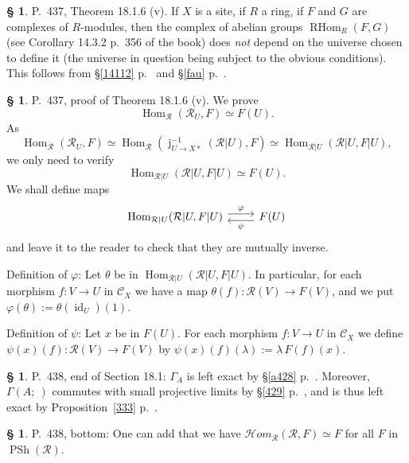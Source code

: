 \documentclass[12pt]{article}
\theoremstyle{remark}
\theoremstyle{definition}
\newtheorem{s}[thm]{\S}
\newcommand{\cc}{\mathcal}
\newcommand{\oo}{\operatorname}
\newcommand{\C}{\mathcal C}
\newcommand{\pp}{\varphi}
\newcommand{\HOM}{\cc H\!\mathit{om}}
\DeclareMathOperator{\id}{id}
\DeclareMathOperator{\Hom}{Hom}
\DeclareMathOperator{\RHom}{RHom}
\begin{document}
%

\begin{s}
P.~437, Theorem 18.1.6 (v). If $X$ is a site, if $R$ a ring, if $F$ and $G$ are complexes of $R$-modules, then the complex of abelian groups $\RHom_R(F,G)$ (see Corollary 14.3.2 p.~356 of the book) does {\em not} depend on the universe chosen to define it (the universe in question being subject to the obvious conditions). This follows from \S\ref{14112} p.~\pageref{14112} and \S\ref{fau} p.~\pageref{fau}. 
\end{s} 

%

\begin{s} 
P.~437, proof of Theorem 18.1.6 (v). We prove 
$$
\Hom_{\cc R}(\cc R_U,F)\simeq F(U).
$$ 
As 
$$
\Hom_{\cc R}(\cc R_U,F)\simeq\Hom_{\cc R}(\oo j_{U\to X*}^{-1}(\cc R|U),F)\simeq
\Hom_{\cc R|U}(\cc R|U,F|U), 
$$ 
we only need to verify 
$$
\Hom_{\cc R|U}(\cc R|U,F|U)\simeq F(U).
$$ 
We shall define maps 
$$
\begin{tikzcd}
\Hom_{\cc R|U}(\cc R|U,F|U)\ar[yshift=0.7ex]{r}{\pp}&F(U)\ar[yshift=-0.7ex]{l}{\psi}
\end{tikzcd}
$$ 
and leave it to the reader to check that they are mutually inverse. 

Definition of $\pp$: Let $\theta$ be in $\Hom_{\cc R|U}(\cc R|U,F|U)$. In particular, for each morphism $f:V\to U$ in $\C_X$ we have a map $\theta(f):\cc R(V)\to F(V)$, and we put $\pp(\theta):=\theta(\id_U)(1)$. 

Definition of $\psi$: Let $x$ be in $F(U)$. For each morphism $f:V\to U$ in $\C_X$ we define $\psi(x)(f):\cc R(V)\to F(V)$ by $\psi(x)(f)(\lambda):=\lambda\,F(f)(x)$.
\end{s}

%

\begin{s}\label{a438}
P.~438, end of Section 18.1: $\Gamma_A$ is left exact by \S\ref{a428} p.~\pageref{a428}. Moreover, $\Gamma(A;\ )$ commutes with small projective limits by \S\ref{429} p.~\pageref{429}, and is thus left exact by Proposition~\ref{333} p.~\pageref{333}. 
\end{s} 

% 

\begin{s}\label{homrr}
P.~438, bottom: One can add that we have $\HOM_{\cc R}(\cc R,F)\simeq F$ for all $F$ in $\oo{PSh}(\cc R)$. 
\end{s} 

% 
\end{document}
